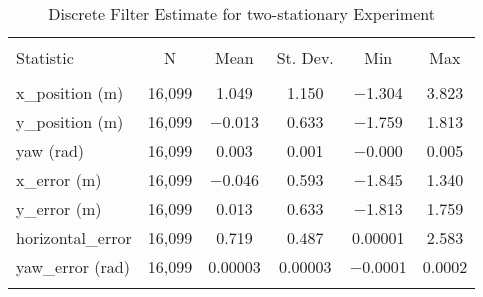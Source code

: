 
\begin{table}[h] \centering 
  \caption{Discrete Filter Estimate for two-stationary Experiment} 
  \label{tab:two_stationary_discrete_summary} 
\begin{tabular}{@{\extracolsep{5pt}}lccccc} 
\\[-1.8ex]\hline 
\hline \\[-1.8ex] 
Statistic & \multicolumn{1}{c}{N} & \multicolumn{1}{c}{Mean} & \multicolumn{1}{c}{St. Dev.} & \multicolumn{1}{c}{Min} & \multicolumn{1}{c}{Max} \\ 
\hline \\[-1.8ex] 
x\_position (m) & 16,099 & \num{1.049} & \num{1.150} & \num{-1.304} & \num{3.823} \\ 
y\_position (m) & 16,099 & \num{-0.013} & \num{0.633} & \num{-1.759} & \num{1.813} \\ 
yaw (rad) & 16,099 & \num{0.003} & \num{0.001} & \num{-0.000} & \num{0.005} \\ 
x\_error (m) & 16,099 & \num{-0.046} & \num{0.593} & \num{-1.845} & \num{1.340} \\ 
y\_error (m) & 16,099 & \num{0.013} & \num{0.633} & \num{-1.813} & \num{1.759} \\ 
horizontal\_error & 16,099 & \num{0.719} & \num{0.487} & \num{0.00001} & \num{2.583} \\ 
yaw\_error (rad) & 16,099 & \num{0.00003} & \num{0.00003} & \num{-0.0001} & \num{0.0002} \\ 
\hline \\[-1.8ex] 
\end{tabular} 
\end{table} 
